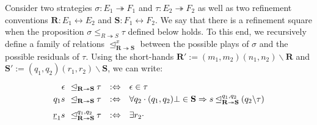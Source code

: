 \documentclass[acmsmall,nonacm]{acmart}
\begin{document}
\begin{definition}
Consider two strategies
$\sigma : E_1 \twoheadrightarrow F_1$ and
$\tau : E_2 \twoheadrightarrow F_2$
as well as two refinement conventions
$\mathbf{R} : E_1 \leftrightarrow E_2$ and
$\mathbf{S} : F_1 \leftrightarrow F_2$.
We say that there is a refinement square
when the proposition
$\sigma \le_{R \twoheadrightarrow S} \tau$
defined below holds.
%
To this end,
we recursively define a family of relations
$\unlhd^x_{\mathbf{R} \twoheadrightarrow \mathbf{S}}$
between the possible plays of $\sigma$
and the possible residuals of $\tau$.
Using the short-hands 
$\mathbf{R}' := (m_1,m_2)(n_1,n_2) \backslash \mathbf{R}$ and
$\mathbf{S}' := (q_1,q_2)(r_1,r_2) \backslash \mathbf{S}$,
we can write:
\[
\def\arraystretch{1.2}
\begin{array}{r@{\:\:\:}l@{\:}l@{\quad:\Leftrightarrow\quad}l}
  \epsilon &
  \unlhd_{\mathbf{R} \twoheadrightarrow \mathbf{S}} &
  \tau &
    \epsilon \in \tau
  \\
  q_1 s &
  \unlhd_{\mathbf{R} \twoheadrightarrow \mathbf{S}} &
  \tau &
    \forall q_2 \cdot
      (q_1, q_2)\bot \in \mathbf{S} \Rightarrow
      s \unlhd_{\mathbf{R} \twoheadrightarrow \mathbf{S}}^{q_1,q_2}
      (q_2 \backslash \tau)
  \\[1ex]
  \underline{r}_1 s &
  \unlhd_{\mathbf{R} \twoheadrightarrow \mathbf{S}}^{q_1,q_2} &
  \tau &
    \exists r_2 \cdot

\end{array}\]
\end{definition}
\end{document}
